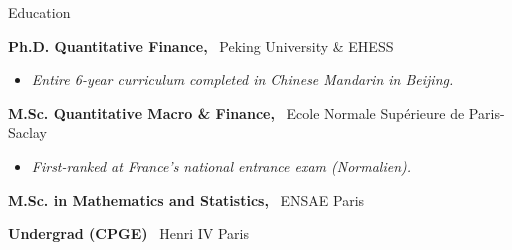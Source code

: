 \documentclass[usegeometry, 10pt, a4paper]{cv} %
\newcommand{\activite}[1]{\textbf{#1}\ }
\begin{document}
\begin{rubriquetableau}[0.95\textwidth]{Education}\\
  \vspace{-0.5cm}
  
  \activite{Ph.D. Quantitative Finance,} Peking University \& EHESS \\
  \vspace{-0.5cm}  
  \begin{itemize}[label={},
    rightmargin=\dimexpr\linewidth-13cm-\leftmargin\relax]
  \item \small{\emph{Entire 6-year curriculum completed in Chinese Mandarin in Beijing.}}
  \end{itemize}
  
  \vspace{0.2cm}
  
  \activite{M.Sc. Quantitative Macro \& Finance,} Ecole Normale Supérieure de Paris-Saclay \\
  \vspace{-0.5cm}
  \begin{itemize}[label={}, rightmargin=\dimexpr\linewidth-13cm-\leftmargin\relax]
  \item \small{\emph{First-ranked at France's national entrance exam (Normalien).}}
  \end{itemize}

  \vspace{0.2cm}
  
  \activite{M.Sc. in Mathematics and Statistics,} ENSAE Paris\\

  \vspace{0.2cm}
  
  \activite{Undergrad (CPGE)} Henri IV Paris
  \end{rubriquetableau}

\newpage

\end{document}
